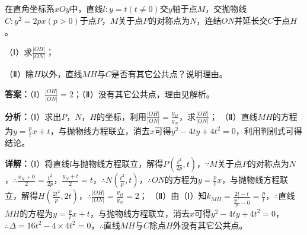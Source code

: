 \begin{question}[points=12]
在直角坐标系$xOy$中，直线$l:y=t(t\neq0)$交$y$轴于点$M$，交抛物线$C:y^2=2px(p>0)$于点$P$，$M$关于点$P$的对称点为$N$，连结$ON$并延长交$C$于点$H$。

（Ⅰ）求$\frac{|OH|}{|ON|}$；

（Ⅱ）除$H$以外，直线$MH$与$C$是否有其它公共点？说明理由。
\begin{solution}
\textbf{答案：}（Ⅰ）$\frac{|OH|}{|ON|}=2$；（Ⅱ）没有其它公共点，理由见解析。

\textbf{分析：}（Ⅰ）求出$P$，$N$，$H$的坐标，利用$\frac{|OH|}{|ON|}=\frac{y_H}{y_N}$，求$\frac{|OH|}{|ON|}$；
（Ⅱ）直线$MH$的方程为$y=\frac{p}{t}x+t$，与抛物线方程联立，消去$x$可得$y^2-4ty+4t^2=0$，利用判别式可得结论。

\textbf{详解：}（Ⅰ）将直线$l$与抛物线方程联立，解得$P(\frac{t^2}{2p},t)$，$\because M$关于点$P$的对称点为$N$，$\therefore \frac{x_N+0}{2}=\frac{t^2}{2p}$，$\frac{y_N+t}{2}=t$，$\therefore N(\frac{t^2}{p},t)$，$\therefore ON$的方程为$y=\frac{p}{t}x$，与抛物线方程联立，解得$H(\frac{2t^2}{p},2t)$，$\therefore \frac{|OH|}{|ON|}=\frac{y_H}{y_N}=2$；
（Ⅱ）由（Ⅰ）知$k_{MH}=\frac{2t-t}{\frac{2t^2}{p}-0}=\frac{p}{t}$，$\therefore$直线$MH$的方程为$y=\frac{p}{t}x+t$，与抛物线方程联立，消去$x$可得$y^2-4ty+4t^2=0$，$\therefore \Delta=16t^2-4\times4t^2=0$，$\therefore$直线$MH$与$C$除点$H$外没有其它公共点。
\end{solution}
\end{question}

